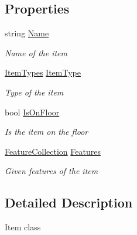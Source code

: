 \subsection*{Properties}
\begin{DoxyCompactItemize}
\item 
string \hyperlink{class_hel_project_1_1_game_world_1_1_h_item_ad6e286a2833c7a01297544008e6e9e67}{Name}
\begin{DoxyCompactList}\small\item\em Name of the item \end{DoxyCompactList}\item 
\hyperlink{class_hel_project_1_1_game_world_1_1_h_item_a7440e7b22ff0e62bcaf89a513716357b}{Item\+Types} \hyperlink{class_hel_project_1_1_game_world_1_1_h_item_aeeb877e7d0f3aa3adf04c17c67bb385f}{Item\+Type}
\begin{DoxyCompactList}\small\item\em Type of the item \end{DoxyCompactList}\item 
bool \hyperlink{class_hel_project_1_1_game_world_1_1_h_item_a5fd0a52b0f490f80d0c7abec4b3293c5}{Is\+On\+Floor}
\begin{DoxyCompactList}\small\item\em Is the item on the floor \end{DoxyCompactList}\item 
\hyperlink{class_hel_project_1_1_features_1_1_feature_collection}{Feature\+Collection} \hyperlink{class_hel_project_1_1_game_world_1_1_h_item_a62269e669b1ff06f017424341ffd7cb9}{Features}
\begin{DoxyCompactList}\small\item\em Given features of the item \end{DoxyCompactList}\end{DoxyCompactItemize}


\subsection{Detailed Description}
Item class 



